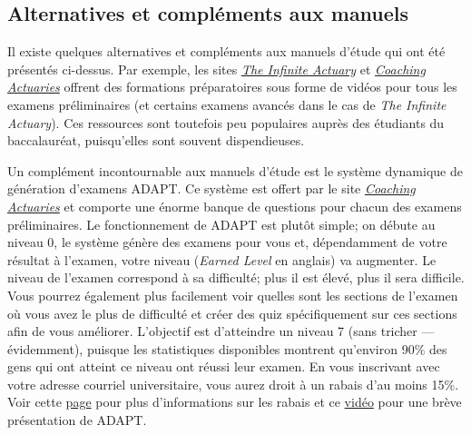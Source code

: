 \newpage

\subsection*{Alternatives et compléments aux manuels}
\label{subsec:alternatives}
Il existe quelques alternatives et compléments aux manuels d'étude qui ont été présentés ci-dessus. Par exemple, les sites \href{http://www.theinfiniteactuary.com/}{\emph{The Infinite Actuary}} et \href{https://www.coachingactuaries.com/}{\emph{Coaching Actuaries}} offrent des formations préparatoires sous forme de vidéos pour tous les examens préliminaires (et certains examens avancés dans le cas de \emph{The Infinite Actuary}). Ces ressources sont toutefois peu populaires auprès des étudiants du baccalauréat, puisqu'elles sont souvent dispendieuses.\vspace{\baselineskip}

Un complément incontournable aux manuels d'étude est le système dynamique de génération d'examens ADAPT. Ce système est offert par le site \href{https://www.coachingactuaries.com/}{\emph{Coaching Actuaries}} et comporte une énorme banque de questions pour chacun des examens préliminaires. Le fonctionnement de ADAPT est plutôt simple; on débute au niveau 0, le système génère des examens pour vous et, dépendamment de votre résultat à l'examen, votre niveau (\emph{Earned Level} en anglais) va augmenter. Le niveau de l'examen correspond à sa difficulté; plus il est élevé, plus il sera difficile. Vous pourrez également plus facilement voir quelles sont les sections de l'examen où vous avez le plus de difficulté et créer des quiz spécifiquement sur ces sections afin de vous améliorer. L'objectif est d'atteindre un niveau 7 (sans tricher --- évidemment), puisque les statistiques disponibles montrent qu'environ 90\% des gens qui ont atteint ce niveau ont réussi leur examen. En vous inscrivant avec votre adresse courriel universitaire, vous aurez droit à un rabais d'au moins 15\%. Voir cette \href{https://www.coachingactuaries.com/Students}{page} pour plus d'informations sur les rabais et ce \href{https://www.youtube.com/watch?v=ZBxLa2J5jhs}{vidéo} pour une brève présentation de ADAPT.

\newpage